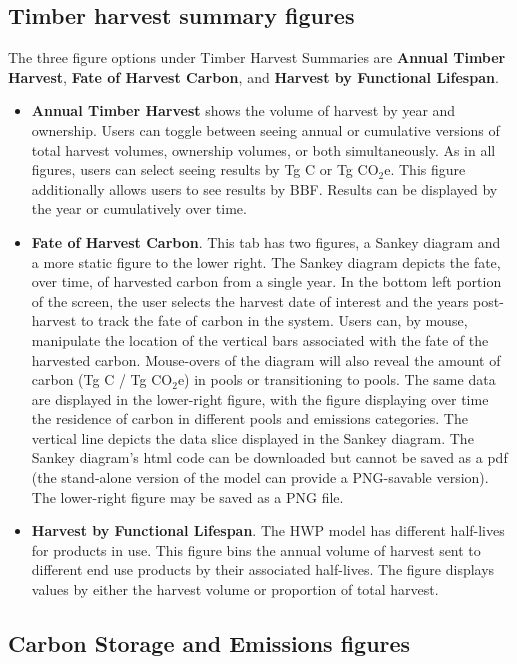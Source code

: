 \documentclass[
  openany]{book}
\begin{document}
\hypertarget{app-shiny-timber}{%
\subsection{Timber harvest summary figures}\label{app-shiny-timber}}

The three figure options under Timber Harvest Summaries are \textbf{Annual Timber Harvest}, \textbf{Fate of Harvest Carbon}, and \textbf{Harvest by Functional Lifespan}.

\begin{itemize}
\item
  \textbf{Annual Timber Harvest} shows the volume of harvest by year and ownership. Users can toggle between seeing annual or cumulative versions of total harvest volumes, ownership volumes, or both simultaneously. As in all figures, users can select seeing results by Tg C or Tg CO\(_2\)e. This figure additionally allows users to see results by BBF. Results can be displayed by the year or cumulatively over time.
\item
  \textbf{Fate of Harvest Carbon}. This tab has two figures, a Sankey diagram and a more static figure to the lower right. The Sankey diagram depicts the fate, over time, of harvested carbon from a single year. In the bottom left portion of the screen, the user selects the harvest date of interest and the years post-harvest to track the fate of carbon in the system. Users can, by mouse, manipulate the location of the vertical bars associated with the fate of the harvested carbon. Mouse-overs of the diagram will also reveal the amount of carbon (Tg C / Tg CO\(_2\)e) in pools or transitioning to pools. The same data are displayed in the lower-right figure, with the figure displaying over time the residence of carbon in different pools and emissions categories. The vertical line depicts the data slice displayed in the Sankey diagram. The Sankey diagram's html code can be downloaded but cannot be saved as a pdf (the stand-alone version of the model can provide a PNG-savable version). The lower-right figure may be saved as a PNG file.
\item
  \textbf{Harvest by Functional Lifespan}. The HWP model has different half-lives for products in use. This figure bins the annual volume of harvest sent to different end use products by their associated half-lives. The figure displays values by either the harvest volume or proportion of total harvest.
\end{itemize}

\hypertarget{app-shiny-cse}{%
\subsection{Carbon Storage and Emissions figures}\label{app-shiny-cse}}
\end{document}
